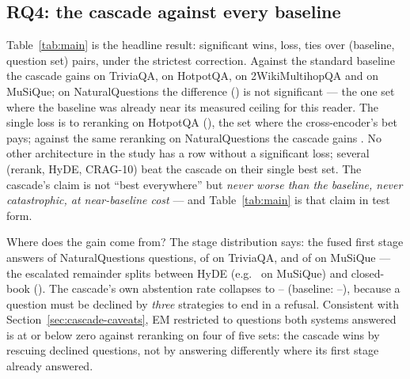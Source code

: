 \subsection{RQ4: the cascade against every baseline}
\label{sec:results-main}

\begin{widetable}[t]
\caption{The proposed cascade against every baseline on every question
set. Each cell is the paired Exact Match difference (cascade minus
baseline); \textbf{bold} marks a significant cascade win and
\underline{underline} a significant loss under McNemar's test with Holm
adjustment over all \ResultPairs{} cells jointly. The cascade wins
\ResultWins{}, loses \ResultLosses{}, ties \ResultTies{}.}
\label{tab:main}
\fitwidth{\ResultTable}
\end{widetable}

Table~\ref{tab:main} is the headline result: \ResultWins{} significant
wins, \ResultLosses{} loss, \ResultTies{} ties over \ResultPairs{}
(baseline, question set) pairs, under the strictest correction. Against
the standard baseline the cascade gains
\NaiveVsCascadeTriviaQAExactMatchDiff{} on TriviaQA,
\NaiveVsCascadeHotpotQAExactMatchDiff{} on HotpotQA,
\NaiveVsCascadeTwoWikiExactMatchDiff{} on 2WikiMultihopQA and
\NaiveVsCascadeMuSiQueExactMatchDiff{} on MuSiQue; on NaturalQuestions the
difference (\NaiveVsCascadeNQExactMatchDiff) is not significant --- the
one set where the baseline was already near its measured ceiling for this
reader. The single loss is to reranking on HotpotQA
(\RerankVsCascadeHotpotQAExactMatchDiff), the set where the
cross-encoder's bet pays; against the same reranking on NaturalQuestions
the cascade gains \RerankVsCascadeNQExactMatchDiff. No other architecture
in the study has a row without a significant loss; several
(rerank, HyDE, CRAG-10) beat the cascade on their single best set. The
cascade's claim is not ``best everywhere'' but \emph{never worse than the
baseline, never catastrophic, at near-baseline cost} --- and
Table~\ref{tab:main} is that claim in test form.

Where does the gain come from? The stage distribution says: the fused
first stage answers \CascadeNQStageFused{} of \CascadeNQQuestions{}
NaturalQuestions questions, \CascadeTriviaQAStageFused{} of
\CascadeTriviaQAQuestions{} on TriviaQA, and
\CascadeMuSiQueStageFused{} of \CascadeMuSiQueQuestions{} on MuSiQue ---
the escalated remainder splits between HyDE
(e.g.\ \CascadeMuSiQueStageHyde{} on MuSiQue) and closed-book
(\CascadeMuSiQueStageClosedbook). The cascade's own abstention rate
collapses to \CascadeTriviaQAAbstentionRate--\CascadeMuSiQueAbstentionRate{}
(baseline: \NaiveRAGTriviaQAAbstentionRate--\NaiveRAGMuSiQueAbstentionRate),
because a question must be declined by \emph{three} strategies to end in a
refusal. Consistent with Section~\ref{sec:cascade-caveats}, EM restricted
to questions both systems answered is at or below zero against reranking
on four of five sets: the cascade wins by rescuing declined questions,
not by answering differently where its first stage already answered.


